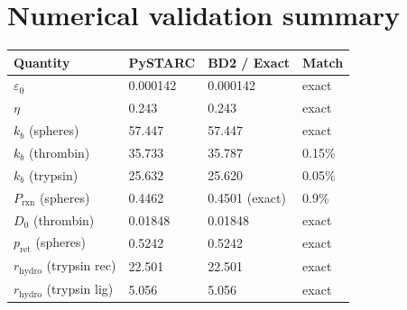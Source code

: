 \documentclass[11pt]{article}
\begin{document}
\section{Numerical validation summary}

\begin{tabular}{llll}
\toprule
Quantity & PySTARC & BD2 / Exact & Match \\
\midrule
$\varepsilon_0$ & 0.000142 & 0.000142 & exact \\
$\eta$ & 0.243 & 0.243 & exact \\
$k_b$ (spheres) & 57.447 & 57.447 & exact \\
$k_b$ (thrombin) & 35.733 & 35.787 & 0.15\% \\
$k_b$ (trypsin) & 25.632 & 25.620 & 0.05\% \\
$P_\mathrm{rxn}$ (spheres) & 0.4462 & 0.4501 (exact) & 0.9\% \\
$D_0$ (thrombin) & 0.01848 & 0.01848 & exact \\
$p_\mathrm{ret}$ (spheres) & 0.5242 & 0.5242 & exact \\
$r_\mathrm{hydro}$ (trypsin rec) & 22.501 & 22.501 & exact \\
$r_\mathrm{hydro}$ (trypsin lig) & 5.056 & 5.056 & exact \\
\bottomrule
\end{tabular}
\end{document}
